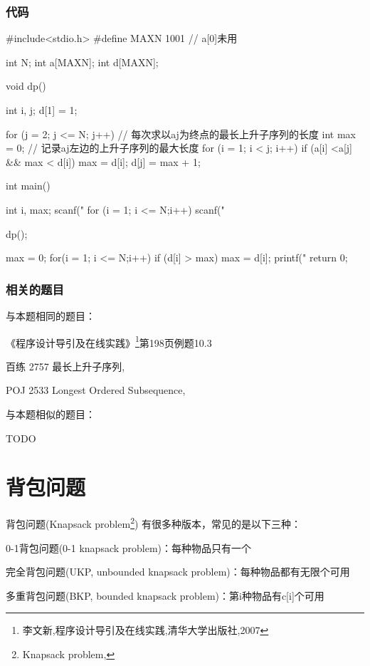 \subsubsection{代码}

\begin{Codex}[label=lis.c]
#include<stdio.h>
#define MAXN 1001 // a[0]未用

int N;
int a[MAXN];
int d[MAXN];

void dp() {
    int i, j;
    d[1] = 1;
 
    for (j = 2; j <= N; j++) { // 每次求以aj为终点的最长上升子序列的长度
        int max = 0;  // 记录aj左边的上升子序列的最大长度 
        for (i = 1; i < j; i++)  if (a[i] <a[j] && max < d[i]) max = d[i];
        d[j] = max + 1;
    }
}

int main() {
    int i, max;
    scanf("%
    for (i = 1; i <= N;i++) scanf("%
    
    dp();

    max = 0;
    for(i = 1; i <= N;i++) if (d[i] > max) max = d[i];
    printf("%
    return 0;
}
\end{Codex}

\subsubsection{相关的题目}
与本题相同的题目：
\begindot
\item 《程序设计导引及在线实践》\footnote{李文新,程序设计导引及在线实践,清华大学出版社,2007}第198页例题10.3
\item  百练 2757 最长上升子序列, 
\item POJ 2533 Longest Ordered Subsequence, 
\myenddot

与本题相似的题目：
\begindot
\item  TODO
\myenddot

\section{背包问题} %
背包问题(Knapsack problem\footnote{Knapsack problem, })
有很多种版本，常见的是以下三种：
\begindot
\item 0-1背包问题(0-1 knapsack problem)：每种物品只有一个
\item 完全背包问题(UKP, unbounded knapsack problem)：每种物品都有无限个可用
\item 多重背包问题(BKP, bounded knapsack problem)：第i种物品有c[i]个可用
\myenddot

